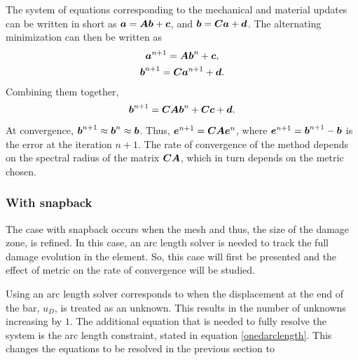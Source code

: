 \documentclass[11pt]{elsarticle}
\begin{document}
The system of equations corresponding to the mechanical and material updates can be written in short as $\mbox{\boldmath $a$} = \mbox{\boldmath $A$} \mbox{\boldmath $b$} + \mbox{\boldmath $c$}$, and $\mbox{\boldmath $b$} = \mbox{\boldmath $C$} \mbox{\boldmath $a$} + \mbox{\boldmath $d$}$. The alternating minimization can then be written as
\begin{gather}
	\mbox{\boldmath $a$}^{n+1} = \mbox{\boldmath $A$} \mbox{\boldmath $b$}^{n} + \mbox{\boldmath $c$}, \\
	\mbox{\boldmath $b$}^{n+1} = \mbox{\boldmath $C$} \mbox{\boldmath $a$}^{n+1} + \mbox{\boldmath $d$}.
\end{gather}
Combining them together, 
\begin{equation}
	\mbox{\boldmath $b$}^{n+1} = \mbox{\boldmath $C$} \mbox{\boldmath $A$} \mbox{\boldmath $b$}^{n} +\mbox{\boldmath $C$} \mbox{\boldmath $c$} + \mbox{\boldmath $d$}. \label{combined_equn}
\end{equation}
At convergence, $\mbox{\boldmath $b$}^{n+1} \approx \mbox{\boldmath $b$}^{n} \approx \mbox{\boldmath $b$}$. Thus, $\mbox{\boldmath $e$}^{n+1} = \mbox{\boldmath $C$} \mbox{\boldmath $A$} \mbox{\boldmath $e$}^{n}$, where $\mbox{\boldmath $e$}^{n+1} = \mbox{\boldmath $b$}^{n+1} - \mbox{\boldmath $b$}$ is the error at the iteration $n+1$. The rate of convergence of the method depends on the spectral radius of the matrix $\mbox{\boldmath $C$} \mbox{\boldmath $A$}$, which in turn depends on the metric chosen. 

\subsubsection*{With snapback}
The case with snapback occurs when the mesh and thus, the size of the damage zone, is refined. In this case, an arc length solver is needed to track the full damage evolution in the element. So, this case will first be presented and the effect of metric on the rate of convergence will be studied.

Using an arc length solver corresponds to when the displacement at the end of the bar, $u_D$, is treated as an unknown. This results in the number of unknowns increasing by $1$. The additional equation that is needed to fully resolve the system is the arc length constraint, stated in equation \ref{onedarclength}. This changes the equations to be resolved in the previous section to 
\end{document}
